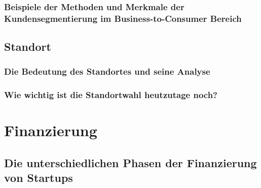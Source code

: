 \subsection{Beispiele der Methoden und Merkmale der Kundensegmentierung im Business-to-Consumer Bereich}

\section{Standort}
\subsection{Die Bedeutung des Standortes und seine Analyse}

\subsection{Wie wichtig ist die Standortwahl heutzutage noch?}

\chapter{Finanzierung}
\section{Die unterschiedlichen Phasen der Finanzierung von Startups}

